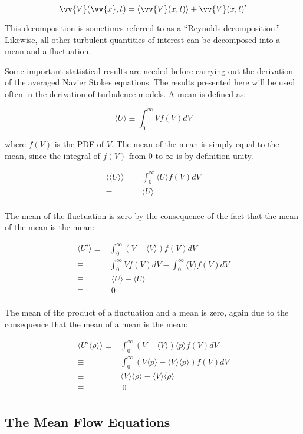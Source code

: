 \documentclass[10pt]{article}
\newcommand{\beq}{\begin{equation}}
\newcommand{\eeq}{\end{equation}}
\newcommand{\beqa}{\begin{equation}\begin{aligned}}
\newcommand{\eeqa}{\end{aligned}\end{equation}}
\newcommand{\la}{\langle}
\newcommand{\ra}{\rangle}
\begin{document}
\begin{flushleft}
\beq
\vv{V}(\vv{x},t)=\la\vv{V}(x,t)\rangle+\vv{V}(x,t)'
\eeq

This decomposition is sometimes referred to as a ``Reynolds decomposition.'' Likewise, all other turbulent quantities of interest can be decomposed into a mean and a fluctuation. 

\begin{tcolorbox}[breakable]
Some important statistical results are needed before carrying out the derivation of the averaged Navier Stokes equations. The results presented here will be used often in the derivation of turbulence models. A mean is defined as:

\beq
\la U\ra\equiv\int_{0}^{\infty}Vf(V)dV
\eeq

where \(f(V)\) is the PDF of \(V\). The mean of the mean is simply equal to the mean, since the integral of \(f(V)\) from 0 to \(\infty\) is by definition unity. 

\beqa
\la\la U\ra\ra=&\int_{0}^{\infty}\la U\ra f(V)dV\\
=&\la U\ra\\
\eeqa

The mean of the fluctuation is zero by the consequence of the fact that the mean of the mean is the mean:

\beqa
\la U'\ra\equiv&\int_{0}^{\infty}(V-\la V\ra)f(V)dV\\
\equiv& \int_{0}^{\infty}Vf(V)dV - \int_{0}^{\infty}\la V\ra f(V)dV\\
\equiv&\ \la U\ra - \la U\ra\\
\equiv&\ 0\\
\eeqa

The mean of the product of a fluctuation and a mean is zero, again due to the consequence that the mean of a mean is the mean:

\beqa
\la U'\la\rho\ra\ra\equiv&\int_{0}^{\infty}(V-\la V\ra)\la p\ra f(V)dV\\
\equiv&\int_{0}^{\infty}\left(V\la p\ra-\la V\ra\la p\ra\right)f(V)dV\\
\equiv&\la V\ra\la\rho\ra-\la V\ra\la\rho\ra\\
\equiv&\ 0\\
\eeqa

\end{tcolorbox}




\subsection{The Mean Flow Equations}


\end{flushleft}
\end{document}
